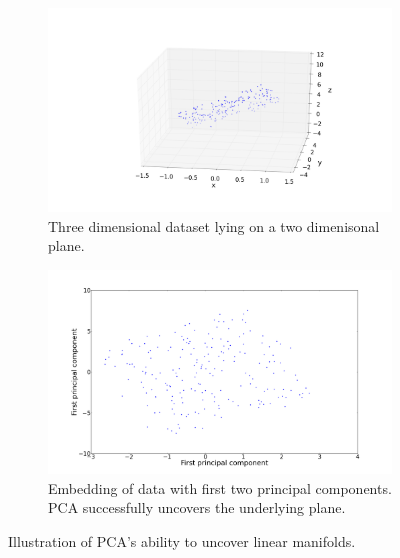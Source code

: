 \documentclass[11pt]{article}
\begin{document}
\begin{figure}[!h]
  \begin{subfigure}{.5\textwidth}
    \begin{center}
      \includegraphics[width=1.2\textwidth]{pca_dataset}
      \caption{Three dimensional dataset lying on a two dimenisonal plane.}
      \label{fig:pca:dataset}
    \end{center}
  \end{subfigure}
  \begin{subfigure}{.5\textwidth}
    \begin{center}
      \includegraphics[width=1.0\textwidth]{pca_embedding}
      \caption{Embedding of data with first two principal components. PCA successfully uncovers the underlying plane.}
      \label{fig:pca:embedding}
    \end{center}
  \end{subfigure}
  \caption{Illustration of PCA's ability to uncover linear manifolds.}
  \label{fig:pca}
\end{figure}
\end{document}
